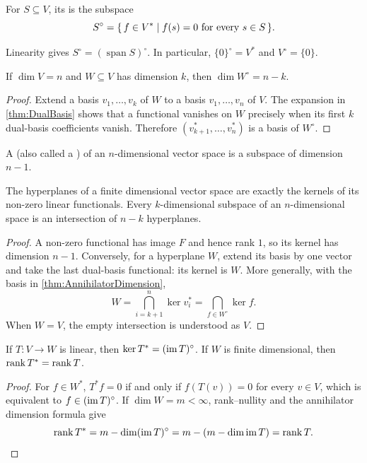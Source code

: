 \begin{Definition}
For $S\subseteq V$, its  is the subspace
\begin{equation*}
S^\circ=\qty{\, f\in V^* \mid f(s)=0\text{ for every }s\in S \,}.
\end{equation*}
\end{Definition}

Linearity gives $S^\circ=(\operatorname{span}S)^\circ$. In particular, $\{0\}^\circ=V^*$ and $V^\circ=\{0\}$.

\begin{Theorem}\label{thm:AnnihilatorDimension}
If $\dim V=n$ and $W\subseteq V$ has dimension $k$, then $\dim W^\circ=n-k$.
\end{Theorem}
\begin{proof}
Extend a basis $v_1,\ldots,v_k$ of $W$ to a basis $v_1,\ldots,v_n$ of $V$. The expansion in \cref{thm:DualBasis} shows that a functional vanishes on $W$ precisely when its first $k$ dual-basis coefficients vanish. Therefore $(v_{k+1}^*,\ldots,v_n^*)$ is a basis of $W^\circ$.
\end{proof}

\begin{Definition}
A  (also called a ) of an $n$-dimensional vector space is a subspace of dimension $n-1$.
\end{Definition}

\begin{Theorem}
The hyperplanes of a finite dimensional vector space are exactly the kernels of its non-zero linear functionals. Every $k$-dimensional subspace of an $n$-dimensional space is an intersection of $n-k$ hyperplanes.
\end{Theorem}
\begin{proof}
A non-zero functional has image $F$ and hence rank $1$, so its kernel has dimension $n-1$. Conversely, for a hyperplane $W$, extend its basis by one vector and take the last dual-basis functional: its kernel is $W$. More generally, with the basis in \cref{thm:AnnihilatorDimension},
\begin{equation*}
W=\bigcap_{i=k+1}^n\ker v_i^*=\bigcap_{f\in W^\circ}\ker f.
\end{equation*}
When $W=V$, the empty intersection is understood as $V$.
\end{proof}

\begin{Theorem}
If $T\colon V\to W$ is linear, then $\ker T^*=(\operatorname{im} T)^\circ$. If $W$ is finite dimensional, then $\rank T^*=\rank T$.
\end{Theorem}
\begin{proof}
For $f\in W^*$, $T^*f=0$ if and only if $f(T(v))=0$ for every $v\in V$, which is equivalent to $f\in(\operatorname{im} T)^\circ$. If $\dim W=m<\infty$, rank--nullity and the annihilator dimension formula give
\begin{equation*}
\rank T^*=m-\dim(\operatorname{im} T)^\circ=m-(m-\dim\operatorname{im} T)=\rank T.
\end{equation*}
\end{proof}


